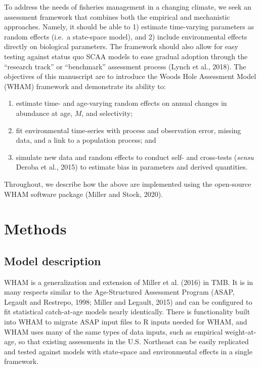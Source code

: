 \documentclass[]{article}
\providecommand{\tightlist}{%
  \setlength{\itemsep}{0pt}\setlength{\parskip}{0pt}}
\begin{document}
To address the needs of fisheries management in a changing climate, we
seek an assessment framework that combines both the empirical and
mechanistic approaches. Namely, it should be able to 1) estimate
time-varying parameters as random effects (i.e.~a state-space model),
and 2) include environmental effects directly on biological parameters.
The framework should also allow for easy testing against status quo SCAA
models to ease gradual adoption through the ``research track'' or
``benchmark'' assessment process (Lynch et al., 2018). The objectives of
this manuscript are to introduce the Woods Hole Assessment Model (WHAM)
framework and demonstrate its ability to:

\begin{enumerate}
\def\labelenumi{\arabic{enumi}.}
\tightlist
\item
  estimate time- and age-varying random effects on annual changes in
  abundance at age, \(M\), and selectivity;
\item
  fit environmental time-series with process and observation error,
  missing data, and a link to a population process; and
\item
  simulate new data and random effects to conduct self- and cross-tests
  (\emph{sensu} Deroba et al., 2015) to estimate bias in parameters and
  derived quantities.
\end{enumerate}

Throughout, we describe how the above are implemented using the
open-source WHAM software package (Miller and Stock, 2020).

\hypertarget{methods}{%
\section{Methods}\label{methods}}

\hypertarget{model-description}{%
\subsection{Model description}\label{model-description}}

WHAM is a generalization and extension of Miller et al. (2016) in TMB.
It is in many respects similar to the Age-Structured Assessment Program
(ASAP, Legault and Restrepo, 1998; Miller and Legault, 2015) and can be
configured to fit statistical catch-at-age models nearly identically.
There is functionality built into WHAM to migrate ASAP input files to R
inputs needed for WHAM, and WHAM uses many of the same types of data
inputs, such as empirical weight-at-age, so that existing assessments in
the U.S. Northeast can be easily replicated and tested against models
with state-space and environmental effects in a single framework.
\end{document}
